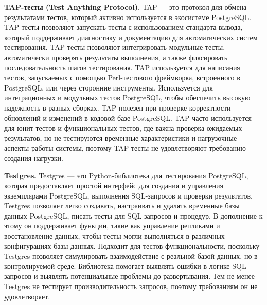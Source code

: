\textbf{TAP-тесты (Test Anything Protocol)}. TAP — это протокол для обмена результатами тестов, который активно используется в экосистеме PostgreSQL. TAP-тесты позволяют запускать тесты с использованием стандарта вывода, который поддерживает диагностику и документацию для автоматических систем тестирования. TAP-тесты позволяют интегрировать модульные тесты, автоматически проверять результаты выполнения, а также фиксировать последовательность шагов тестирования. TAP используется для написания тестов, запускаемых с помощью Perl-тестового фреймворка, встроенного в PostgreSQL, или через сторонние инструменты. Используется для интеграционных и модульных тестов PostgreSQL, чтобы обеспечить высокую надежность в разных сборках. TAP полезен при проверке корректности обновлений и изменений в кодовой базе PostgreSQL. TAP часто используется для юнит-тестов и функциональных тестов, где важна проверка ожидаемых результатов, но не тестируются временные характеристики и нагрузочные аспекты работы системы, поэтому TAP-тесты не удовлетворяют требованию создания нагрузки.

\textbf{Testgres.} Testgres — это Python-библиотека для тестирования PostgreSQL, которая предоставляет простой интерфейс для создания и управления экземплярами PostgreSQL, выполнения SQL-запросов и проверки результатов. Testgres позволяет легко создавать, настраивать и удалять временные базы данных PostgreSQL, писать тесты для SQL-запросов и процедур. В дополнение к этому он поддерживает функции, такие как управление репликами и восстановление данных, чтобы тесты могли выполняться в различных конфигурациях базы данных. Подходит для тестов функциональности, поскольку Testgres позволяет симулировать взаимодействие с реальной базой данных, но в контролируемой среде. Библиотека помогает выявлять ошибки в логике SQL-запросов и выявлять потенциальные проблемы до развертывания. Тем не менее Testgres не тестирует производительность запросов, поэтому требованиям он не удовлетворяет.


